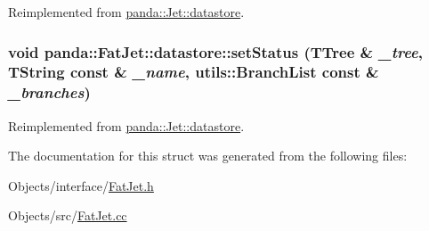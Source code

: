 Reimplemented from \hyperlink{structpanda_1_1Jet_1_1datastore_aba38557e272994b9913ffbe323892d7d}{panda::Jet::datastore}.\hypertarget{structpanda_1_1FatJet_1_1datastore_a7c0b79a4a6e7875278841d4bc8a7deba}{
\subsubsection[{setStatus}]{\setlength{\rightskip}{0pt plus 5cm}void panda::FatJet::datastore::setStatus (TTree \& {\em \_\-tree}, \/  TString const \& {\em \_\-name}, \/  {\bf utils::BranchList} const \& {\em \_\-branches})}}
\label{structpanda_1_1FatJet_1_1datastore_a7c0b79a4a6e7875278841d4bc8a7deba}


Reimplemented from \hyperlink{structpanda_1_1Jet_1_1datastore_ae5a3ebcab7eefec1efc08e4f714ce2ad}{panda::Jet::datastore}.

The documentation for this struct was generated from the following files:\begin{DoxyCompactItemize}
\item 
Objects/interface/\hyperlink{FatJet_8h}{FatJet.h}\item 
Objects/src/\hyperlink{FatJet_8cc}{FatJet.cc}\end{DoxyCompactItemize}
